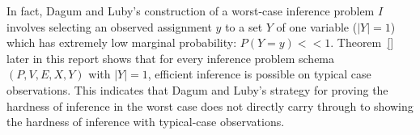 \documentclass{article}
\theoremstyle{definition}
\newtheorem{defn}{Definition}
\theoremstyle{remark}
\begin{document}
In fact, Dagum and Luby's construction of a worst-case inference problem $I$ involves selecting an observed assignment $y$ to a set $Y$ of one variable ($|Y| = 1$) which has extremely low marginal probability: $P(Y = y) << 1$.
Theorem~\ref{} later in this report shows that for every inference problem schema $(P, V, E, X, Y)$ with $|Y| = 1$, efficient inference is possible on typical case observations.
This indicates that Dagum and Luby's strategy for proving the hardness of inference in the worst case does not directly carry through to showing the hardness of inference with typical-case observations.

\end{document}
